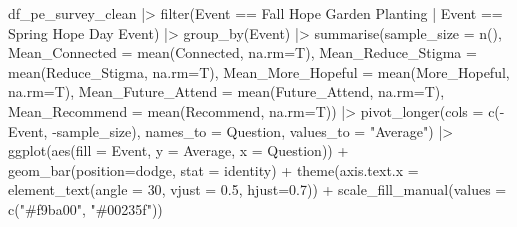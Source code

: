 \documentclass[
  letterpaper,
  DIV=11,
  numbers=noendperiod]{scrartcl}
\newenvironment{Shaded}{\begin{snugshade}}{\end{snugshade}}
\newcommand{\AttributeTok}[1]{\textcolor[rgb]{0.40,0.45,0.13}{#1}}
\newcommand{\DecValTok}[1]{\textcolor[rgb]{0.68,0.00,0.00}{#1}}
\newcommand{\FloatTok}[1]{\textcolor[rgb]{0.68,0.00,0.00}{#1}}
\newcommand{\FunctionTok}[1]{\textcolor[rgb]{0.28,0.35,0.67}{#1}}
\newcommand{\NormalTok}[1]{\textcolor[rgb]{0.00,0.23,0.31}{#1}}
\newcommand{\SpecialCharTok}[1]{\textcolor[rgb]{0.37,0.37,0.37}{#1}}
\newcommand{\StringTok}[1]{\textcolor[rgb]{0.13,0.47,0.30}{#1}}
\begin{document}
\begin{Shaded}
\begin{Highlighting}[]
\NormalTok{df\_pe\_survey\_clean }\SpecialCharTok{|\textgreater{}} 
  \FunctionTok{filter}\NormalTok{(Event }\SpecialCharTok{==} \StringTok{\textquotesingle{}Fall Hope Garden Planting\textquotesingle{}} \SpecialCharTok{|}
\NormalTok{         Event }\SpecialCharTok{==} \StringTok{\textquotesingle{}Spring Hope Day Event\textquotesingle{}}\NormalTok{) }\SpecialCharTok{|\textgreater{}} 
  \FunctionTok{group\_by}\NormalTok{(Event) }\SpecialCharTok{|\textgreater{}} 
  \FunctionTok{summarise}\NormalTok{(}\AttributeTok{sample\_size =} \FunctionTok{n}\NormalTok{(),}
            \AttributeTok{Mean\_Connected =} \FunctionTok{mean}\NormalTok{(Connected, }\AttributeTok{na.rm=}\NormalTok{T),}
            \AttributeTok{Mean\_Reduce\_Stigma =} \FunctionTok{mean}\NormalTok{(Reduce\_Stigma, }\AttributeTok{na.rm=}\NormalTok{T),}
            \AttributeTok{Mean\_More\_Hopeful =} \FunctionTok{mean}\NormalTok{(More\_Hopeful, }\AttributeTok{na.rm=}\NormalTok{T),}
            \AttributeTok{Mean\_Future\_Attend =} \FunctionTok{mean}\NormalTok{(Future\_Attend, }\AttributeTok{na.rm=}\NormalTok{T),}
            \AttributeTok{Mean\_Recommend =} \FunctionTok{mean}\NormalTok{(Recommend, }\AttributeTok{na.rm=}\NormalTok{T)) }\SpecialCharTok{|\textgreater{}} 
  \FunctionTok{pivot\_longer}\NormalTok{(}\AttributeTok{cols =} \FunctionTok{c}\NormalTok{(}\SpecialCharTok{{-}}\NormalTok{Event, }\SpecialCharTok{{-}}\NormalTok{sample\_size),}
               \AttributeTok{names\_to =} \StringTok{\textquotesingle{}Question\textquotesingle{}}\NormalTok{,}
               \AttributeTok{values\_to =} \StringTok{"Average"}\NormalTok{) }\SpecialCharTok{|\textgreater{}} 
  \FunctionTok{ggplot}\NormalTok{(}\FunctionTok{aes}\NormalTok{(}\AttributeTok{fill =}\NormalTok{ Event, }\AttributeTok{y =}\NormalTok{ Average, }\AttributeTok{x =}\NormalTok{ Question)) }\SpecialCharTok{+}
  \FunctionTok{geom\_bar}\NormalTok{(}\AttributeTok{position=}\StringTok{\textquotesingle{}dodge\textquotesingle{}}\NormalTok{, }\AttributeTok{stat =} \StringTok{\textquotesingle{}identity\textquotesingle{}}\NormalTok{) }\SpecialCharTok{+}
  \FunctionTok{theme}\NormalTok{(}\AttributeTok{axis.text.x =} \FunctionTok{element\_text}\NormalTok{(}\AttributeTok{angle =} \DecValTok{30}\NormalTok{, }\AttributeTok{vjust =} \FloatTok{0.5}\NormalTok{, }\AttributeTok{hjust=}\FloatTok{0.7}\NormalTok{)) }\SpecialCharTok{+}
  \FunctionTok{scale\_fill\_manual}\NormalTok{(}\AttributeTok{values =} \FunctionTok{c}\NormalTok{(}\StringTok{"\#f9ba00"}\NormalTok{,}
                               \StringTok{"\#00235f"}\NormalTok{))}
\end{Highlighting}
\end{Shaded}
\end{document}

